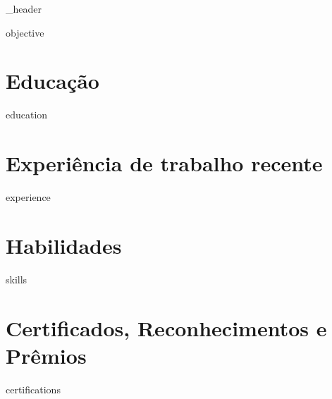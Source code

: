 \documentclass[letter,10pt]{article}
\author{Gabriel Costa De Oliveira} %
\begin{document}
{_header}


\vspace*{21pt}
{objective}
\vspace*{21pt}


\section{\Large Educação}
\vspace*{21pt}
{education}
\vspace*{21pt}




\section{\Large Experiência de trabalho recente}
\vspace*{21pt}
{experience}
\vspace*{21pt}


\section{\Large Habilidades}
\vspace*{21pt}
{skills}
\vspace*{21pt}


\section{\Large Certificados, Reconhecimentos e Prêmios}
\vspace*{21pt}
{certifications}
\vspace*{21pt}


\end{document}
